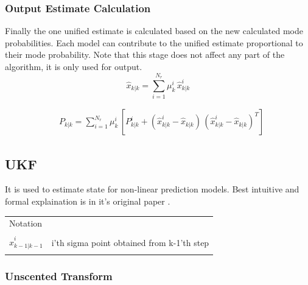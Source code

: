 \documentclass[peerreview]{IEEEtran}
\begin{document}
\subsubsection{Output Estimate Calculation}
Finally the one unified estimate is calculated based on the new calculated mode probabilities. Each model can contribute to the unified estimate proportional to their mode probability. Note that this stage does not affect any part of the algorithm, it is only used for output.
\begin{equation}
\hat{x}_{k|k} = \sum\limits_{i=1}^{N_r} \mu_k^i \, \hat{x}_{k|k}^i
\end{equation}

\begin{equation}
\begin{aligned}
&P_{k|k} = \sum\limits_{i=1}^{N_r} \mu_k^i \, 
[ P_{k|k}^i +   (\hat{x}_{k|k}^i - \hat{x}_{k|k}) \, (\hat{x}_{k|k}^i - \hat{x}_{k|k})^T]
\end{aligned}
\end{equation}


\subsection{UKF}

It is used to estimate state for non-linear prediction models. Best intuitive and formal explaination is in it's original paper \cite{MERWE00}. \\

\vspace{10px}

\begin{center}

\begin{tabularx}{0.4\textwidth }{@{}p{}X@{}}
\toprule
  Notation \\ \\
  $\hat{x}_{k-1|k-1}^i$ & i'th sigma point obtained from k-1'th step \\ \\

  
 
\bottomrule
\end{tabularx}

\end{center}

\label{tbl:UKF Notation Table}


\vspace{10px}

\subsubsection{Unscented Transform}
\end{document}
